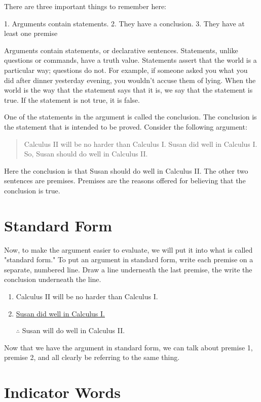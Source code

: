 There are three important things to remember here:

1.  Arguments contain statements.
2.  They have a conclusion.
3.  They have at least one premise

Arguments contain statements, or declarative sentences. Statements,
unlike questions or commands, have a truth value. Statements assert that
the world is a particular way; questions do not. For example, if someone
asked you what you did after dinner yesterday evening, you wouldn't
accuse them of lying. When the world is the way that the statement says
that it is, we say that the statement is true. If the statement is not
true, it is false.

One of the statements in the argument is called the conclusion. The
conclusion is the statement that is intended to be proved. Consider the
following argument:


\begin{quote}
Calculus II will be no harder than Calculus I. Susan did well in
Calculus I. So, Susan should do well in Calculus II.
\end{quote}

Here the conclusion is that Susan should do well in Calculus II. The
other two sentences are premises. Premises are the reasons offered for
believing that the conclusion is true.

\section{Standard Form}
\label{sec:standard-form}

Now, to make the argument easier to evaluate, we will put it into what is called "standard form." To put an argument in standard form, write each premise on a separate, numbered line. Draw a line underneath the last premise, the write the conclusion underneath the line.


\begin{enumerate}
\item Calculus II will be no harder than Calculus I.
\item \underline{Susan did well in Calculus I.}
\item [$\therefore$] Susan will do well in Calculus II.
\end{enumerate}

 Now that we have the argument in standard form, we can talk about premise 1, premise 2, and all clearly be referring to the same thing.

\section{Indicator Words}
\label{sec:indicator-words}

